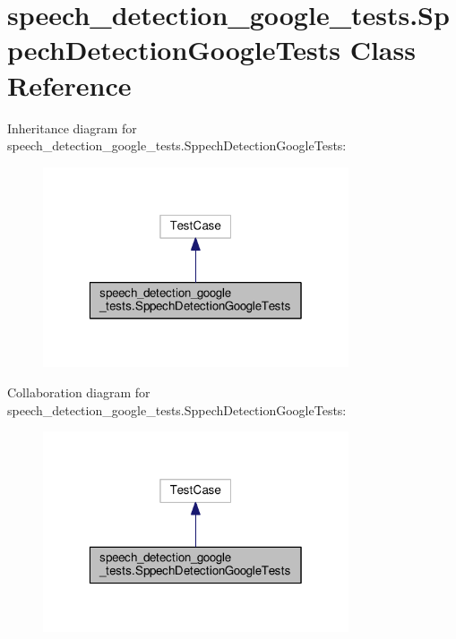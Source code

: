 \hypertarget{classspeech__detection__google__tests_1_1SppechDetectionGoogleTests}{\section{speech\-\_\-detection\-\_\-google\-\_\-tests.\-Sppech\-Detection\-Google\-Tests Class Reference}
\label{classspeech__detection__google__tests_1_1SppechDetectionGoogleTests}
}


Inheritance diagram for speech\-\_\-detection\-\_\-google\-\_\-tests.\-Sppech\-Detection\-Google\-Tests\-:
\nopagebreak
\begin{figure}[H]
\begin{center}
\leavevmode
\includegraphics[width=256pt]{classspeech__detection__google__tests_1_1SppechDetectionGoogleTests__inherit__graph}
\end{center}
\end{figure}


Collaboration diagram for speech\-\_\-detection\-\_\-google\-\_\-tests.\-Sppech\-Detection\-Google\-Tests\-:
\nopagebreak
\begin{figure}[H]
\begin{center}
\leavevmode
\includegraphics[width=256pt]{classspeech__detection__google__tests_1_1SppechDetectionGoogleTests__coll__graph}
\end{center}
\end{figure}
